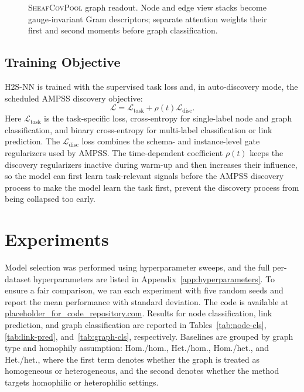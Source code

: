 \documentclass[sigconf,anonymous,review]{acmart}
\newcommand{\method}{\textsc{H2S-NN}}
\newcommand{\ampss}{\textsc{AMPSS}}
\newcommand{\sheafcovpool}{\textsc{SheafCovPool}}
\newcommand{\cL}{\mathcal{L}}
\begin{document}
\begin{figure}[t]
  \centering
  \fbox{\rule{0pt}{4.2cm}\rule{0.94\columnwidth}{0pt}}
  \caption{\sheafcovpool{} graph readout. Node and edge view stacks become
  gauge-invariant Gram descriptors; separate attention weights their first and second moments
  before graph classification.}
  \label{fig:sheafcovpool}
\end{figure}

\subsection{Training Objective}

\method{} is trained with the supervised task loss and, in auto-discovery mode, the scheduled
\ampss{} discovery objective:
\begin{equation}
  \cL
  =\cL_{\mathrm{task}}
   +\rho(t)\cL_{\mathrm{disc}} .
  \label{eq:loss}
\end{equation}
Here \(\cL_{\mathrm{task}}\) is the task-specific loss, cross-entropy for single-label node and graph classification, and
binary cross-entropy for multi-label classification or link prediction. The \(\cL_{\mathrm{disc}}\) loss combines
the schema- and instance-level gate regularizers used by \ampss{}. The time-dependent coefficient \(\rho(t)\) keeps the discovery regularizers inactive during warm-up and then increases their influence, so the model can first learn task-relevant signals before the \ampss{} discovery process to make the model learn the task first, prevent the discovery process from being collapsed too early.



\section{Experiments}
\label{sec:experiments}


Model selection was performed using hyperparameter sweeps, and the full per-dataset hyperparameters are listed in Appendix~\ref{app:hyperparameters}. To ensure a fair comparison, we ran each experiment with five random seeds and report the mean performance with standard deviation. The code is available at \url{placeholder_for_code_repository.com}. Results for node classification, link prediction, and graph classification are reported in Tables~\ref{tab:node-cls}, \ref{tab:link-pred}, and~\ref{tab:graph-cls}, respectively. Baselines are grouped by graph type and homophily assumption: Hom./hom., Het./hom., Hom./het., and Het./het., where the first term denotes whether the graph is treated as homogeneous or heterogeneous, and the second denotes whether the method targets homophilic or heterophilic settings.
\end{document}
